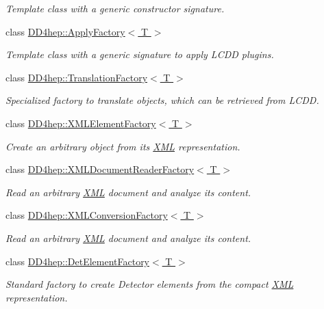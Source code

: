 \begin{DoxyCompactItemize}
\begin{DoxyCompactList}\small\item\em Template class with a generic constructor signature. \end{DoxyCompactList}\item 
class \hyperlink{class_d_d4hep_1_1_apply_factory}{D\+D4hep\+::\+Apply\+Factory$<$ T $>$}
\begin{DoxyCompactList}\small\item\em Template class with a generic signature to apply L\+C\+DD plugins. \end{DoxyCompactList}\item 
class \hyperlink{class_d_d4hep_1_1_translation_factory}{D\+D4hep\+::\+Translation\+Factory$<$ T $>$}
\begin{DoxyCompactList}\small\item\em Specialized factory to translate objects, which can be retrieved from L\+C\+DD. \end{DoxyCompactList}\item 
class \hyperlink{class_d_d4hep_1_1_x_m_l_element_factory}{D\+D4hep\+::\+X\+M\+L\+Element\+Factory$<$ T $>$}
\begin{DoxyCompactList}\small\item\em Create an arbitrary object from it\textquotesingle{}s \hyperlink{namespace_d_d4hep_1_1_x_m_l}{X\+ML} representation. \end{DoxyCompactList}\item 
class \hyperlink{class_d_d4hep_1_1_x_m_l_document_reader_factory}{D\+D4hep\+::\+X\+M\+L\+Document\+Reader\+Factory$<$ T $>$}
\begin{DoxyCompactList}\small\item\em Read an arbitrary \hyperlink{namespace_d_d4hep_1_1_x_m_l}{X\+ML} document and analyze it\textquotesingle{}s content. \end{DoxyCompactList}\item 
class \hyperlink{class_d_d4hep_1_1_x_m_l_conversion_factory}{D\+D4hep\+::\+X\+M\+L\+Conversion\+Factory$<$ T $>$}
\begin{DoxyCompactList}\small\item\em Read an arbitrary \hyperlink{namespace_d_d4hep_1_1_x_m_l}{X\+ML} document and analyze it\textquotesingle{}s content. \end{DoxyCompactList}\item 
class \hyperlink{class_d_d4hep_1_1_det_element_factory}{D\+D4hep\+::\+Det\+Element\+Factory$<$ T $>$}
\begin{DoxyCompactList}\small\item\em Standard factory to create Detector elements from the compact \hyperlink{namespace_d_d4hep_1_1_x_m_l}{X\+ML} representation. \end{DoxyCompactList}\item 

\end{DoxyCompactItemize}
